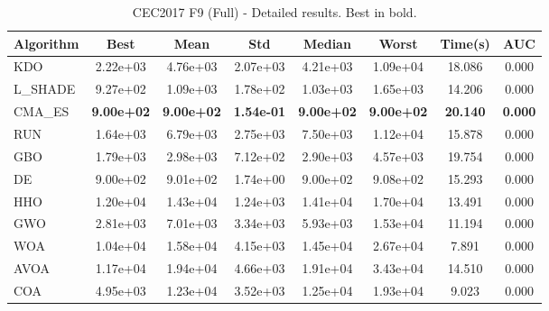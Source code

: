 \begin{table}[H]
\centering\small
\caption{CEC2017 F9 (Full) - Detailed results. Best in bold.}
\label{tab:cec2017_F9}
\begin{tabular}{lccccccc}
\toprule
\textbf{Algorithm} & \textbf{Best} & \textbf{Mean} & \textbf{Std} & \textbf{Median} & \textbf{Worst} & \textbf{Time(s)} & \textbf{AUC} \\
\midrule
KDO & 2.22e+03 & 4.76e+03 & 2.07e+03 & 4.21e+03 & 1.09e+04 & 18.086 & 0.000 \\
L_SHADE & 9.27e+02 & 1.09e+03 & 1.78e+02 & 1.03e+03 & 1.65e+03 & 14.206 & 0.000 \\
CMA_ES & \textbf{9.00e+02} & \textbf{9.00e+02} & \textbf{1.54e-01} & \textbf{9.00e+02} & \textbf{9.00e+02} & \textbf{20.140} & \textbf{0.000} \\
RUN & 1.64e+03 & 6.79e+03 & 2.75e+03 & 7.50e+03 & 1.12e+04 & 15.878 & 0.000 \\
GBO & 1.79e+03 & 2.98e+03 & 7.12e+02 & 2.90e+03 & 4.57e+03 & 19.754 & 0.000 \\
DE & 9.00e+02 & 9.01e+02 & 1.74e+00 & 9.00e+02 & 9.08e+02 & 15.293 & 0.000 \\
HHO & 1.20e+04 & 1.43e+04 & 1.24e+03 & 1.41e+04 & 1.70e+04 & 13.491 & 0.000 \\
GWO & 2.81e+03 & 7.01e+03 & 3.34e+03 & 5.93e+03 & 1.53e+04 & 11.194 & 0.000 \\
WOA & 1.04e+04 & 1.58e+04 & 4.15e+03 & 1.45e+04 & 2.67e+04 & 7.891 & 0.000 \\
AVOA & 1.17e+04 & 1.94e+04 & 4.66e+03 & 1.91e+04 & 3.43e+04 & 14.510 & 0.000 \\
COA & 4.95e+03 & 1.23e+04 & 3.52e+03 & 1.25e+04 & 1.93e+04 & 9.023 & 0.000 \\
\bottomrule
\end{tabular}
\end{table}
